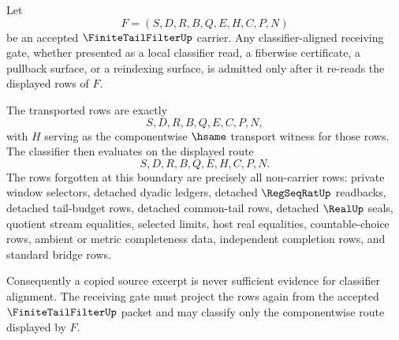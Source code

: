 \begin{theorem}
\label{thm:finite-tail-filter-classifier-alignment-boundary}
Let
$$
F=(S,D,R,B,Q,E,H,C,P,N)
$$
be an accepted $\FiniteTailFilterUp$ carrier. Any classifier-aligned receiving gate, whether presented as a local classifier read, a fiberwise certificate, a pullback surface, or a reindexing surface, is admitted only after it re-reads the displayed rows of $F$.

The transported rows are exactly
$$
S,D,R,B,Q,E,C,P,N,
$$
with $H$ serving as the componentwise $\hsame$ transport witness for those rows. The classifier then evaluates on the displayed route
$$
S,D,R,B,Q,E,H,C,P,N.
$$
The rows forgotten at this boundary are precisely all non-carrier rows: private window selectors, detached dyadic ledgers, detached $\RegSeqRatUp$ readbacks, detached tail-budget rows, detached common-tail rows, detached $\RealUp$ seals, quotient stream equalities, selected limits, host real equalities, countable-choice rows, ambient or metric completeness data, independent completion rows, and standard bridge rows.

Consequently a copied source excerpt is never sufficient evidence for classifier alignment. The receiving gate must project the rows again from the accepted $\FiniteTailFilterUp$ packet and may classify only the componentwise route displayed by $F$.
\end{theorem}
